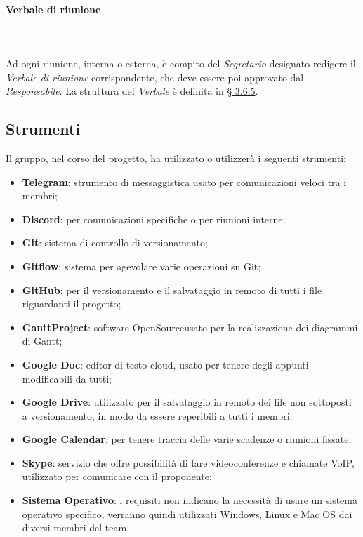 \paragraph{Verbale di riunione} \mbox{} \\ \mbox{} \\
Ad ogni riunione, interna o esterna, è compito del \textit{Segretario} designato redigere il \textit{Verbale di riunione} corrispondente, che deve essere poi approvato dal \textit{Responsabile}. La struttura del \textit{Verbale} è definita in \hyperref[par:verbali]{§ 3.6.5}.


\subsection{Strumenti}
Il gruppo, nel corso del progetto, ha utilizzato o utilizzerà i seguenti strumenti:
\begin{itemize}
	\item \textbf{Telegram}: strumento di messaggistica usato per comunicazioni veloci tra i membri; 
	\item \textbf{Discord}: per comunicazioni specifiche o per riunioni interne;
	\item \textbf{Git}: sistema di controllo di versionamento;
	\item \textbf{Gitflow}: sistema per agevolare varie operazioni su Git;
	\item \textbf{GitHub}: per il versionamento e il salvataggio in remoto di tutti i file riguardanti il progetto;
	\item \textbf{GanttProject}: software OpenSource\glo usato per la realizzazione dei diagrammi di Gantt;
	\item \textbf{Google Doc}: editor di testo cloud, usato per tenere degli appunti modificabili da tutti;
	\item \textbf{Google Drive}: utilizzato per il salvataggio in remoto dei file non sottoposti a versionamento, in modo da essere reperibili a tutti i membri;
	\item \textbf{Google Calendar}: per tenere traccia delle varie scadenze o riunioni fissate;
	\item \textbf{Skype}: servizio che offre possibilità di fare videoconferenze e chiamate VoIP, utilizzato per comunicare con il proponente;
	\item \textbf{Sistema Operativo}: i requisiti non indicano la necessità di usare un sistema operativo specifico, verranno quindi utilizzati Windows, Linux e Mac OS dai diversi membri del team.
\end{itemize}

